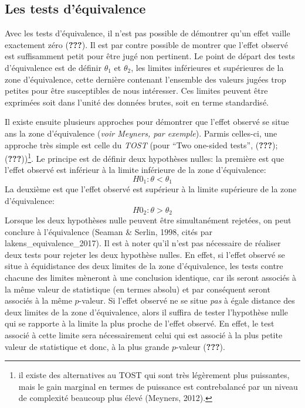 \documentclass[
  english,
  man]{apa6}
\begin{document}
\hypertarget{les-tests-duxe9quivalence}{%
\subsection{Les tests d'équivalence}\label{les-tests-duxe9quivalence}}

Avec les tests d'équivalence, il n'est pas possible de démontrer qu'un effet vaille exactement zéro ({\textbf{???}}). Il est par contre possible de montrer que l'effet observé est suffisamment petit pour être jugé non pertinent. Le point de départ des tests d'équivalence est de définir \(\theta_1\) et \(\theta_2\), les limites inférieures et supérieures de la zone d'équivalence, cette dernière contenant l'ensemble des valeurs jugées trop petites pour être susceptibles de nous intéresser. Ces limites peuvent être exprimées soit dans l'unité des données brutes, soit en terme standardisé.

Il existe ensuite plusieurs approches pour démontrer que l'effet observé se situe ans la zone d'équivalence (\emph{voir Meyners, par exemple}). Parmis celles-ci, une approche très simple est celle du \emph{TOST} (pour \enquote{Two one-sided tests}, ({\textbf{???}}); ({\textbf{???}}))\footnote{il existe des alternatives au TOST qui sont très légèrement plus puissantes, mais le gain marginal en termes de puissance est contrebalancé par un niveau de complexité beaucoup plus élevé (Meyners, 2012).}. Le principe est de définir deux hypothèses nulles: la première est que l'effet observé est inférieur à la limite inférieure de la zone d'équivalence: \[H0_1: \theta < \theta_1\] La deuxième est que l'effet observé est supérieur à la limite supérieure de la zone d'équivalence: \[H0_2: \theta > \theta_2\] Lorsque les deux hypothèses nulle peuvent être simultanément rejetées, on peut conclure à l'équivalence (Seaman \& Serlin, 1998, cités par lakens\_equivalence\_2017). Il est à noter qu'il n'est pas nécessaire de réaliser deux tests pour rejeter les deux hypothèse nulles. En effet, si l'effet observé se situe à équidistance des deux limites de la zone d'équivalence, les tests contre chacune des limites mèneront à une conclusion identique, car ils seront associés à la même valeur de statistique (en termes absolu) et par conséquent seront associés à la même \(p\)-valeur. Si l'effet observé ne se situe \emph{pas} à égale distance des deux limites de la zone d'équivalence, alors il suffira de tester l'hypothèse nulle qui se rapporte à la limite la plus proche de l'effet observé. En effet, le test associé à cette limite sera nécessairement celui qui est associé à la plus petite valeur de statistique et donc, à la plus grande \(p\)-valeur ({\textbf{???}}).
\end{document}
